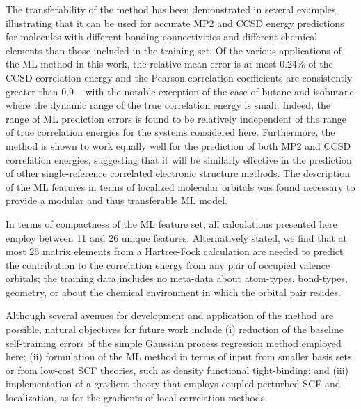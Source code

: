\documentclass[%
 aps,
 prb,
 twocolumn,
%
 reprint,%
%
citeautoscript,
%
showkeys
]{revtex4-1}
\begin{document}
  The transferability of the method has been demonstrated in several examples, illustrating that it can be used for accurate MP2 and CCSD energy predictions  for molecules with different bonding connectivities and different chemical elements than those included in the training set. Of the various applications of the ML method in this work, the relative mean error is at most 0.24\% of the CCSD correlation energy and the Pearson correlation coefficients are consistently greater than 0.9 
-- with the notable exception of the case of butane and isobutane where the dynamic range of the true correlation energy is small. %
Indeed, the range of ML prediction errors is found to be relatively independent of the range of true correlation energies for the systems considered here.
Furthermore, the method is shown to work equally well for the prediction of both MP2 and CCSD correlation energies, suggesting that it will be similarly effective in the prediction of other single-reference correlated electronic structure methods.
The description of the ML features in terms of localized molecular orbitals was found necessary to provide a modular and thus transferable ML model. %

%

In terms of compactness of the ML feature set, all calculations presented here employ between 11 and 26 unique features.  Alternatively stated, %
we find that  at most 26 matrix elements from a Hartree-Fock calculation are needed to predict the contribution to the correlation energy from any pair of occupied valence orbitals; the training data includes no meta-data about atom-types, bond-types, geometry, or about the chemical environment in which the orbital pair resides. 

%

%
%
%
%
%
%
%

Although several avenues for development and application of the method are possible, natural objectives for future work include 
(i) reduction of the baseline self-training errors of the %
simple Gaussian process regression method employed here;
(ii) formulation of the ML method in terms of input from smaller basis sets or from low-cost SCF theories, such as density functional tight-binding;
 and (iii) implementation of a gradient theory that employs coupled perturbed SCF and localization, as for the gradients of local correlation methods.\cite{Schutz2004} %

%

%
%
%
%
%
%
%
%
%
%
%
%
%
%
%
%
%
%
%
%
%
%
%
%
%
%
\end{document}
